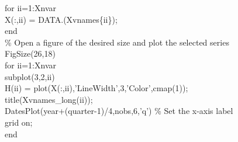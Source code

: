 \hspace{1mm}\hspace{5mm} \textcolor{matlabblue}{for} ii=1:Xnvar \\ 
\hspace{1mm}\hspace{5mm} \hspace{5mm} X(:,ii) = DATA.(Xvnames\{ii\}); \\ 
\hspace{1mm}\hspace{5mm} \textcolor{matlabblue}{end} \\ 
\hspace{1mm}\hspace{5mm} \textcolor{matlabgreen}{\% Open a figure of the desired size and plot the selected series }\\ 
\hspace{1mm}\hspace{5mm} FigSize(26,18) \\ 
\hspace{1mm}\hspace{5mm} \textcolor{matlabblue}{for} ii=1:Xnvar \\ 
\hspace{1mm}\hspace{5mm} \hspace{5mm} subplot(3,2,ii) \\ 
\hspace{1mm}\hspace{5mm} \hspace{5mm} H(ii) = plot(X(:,ii),\textcolor{matlabpurple}{'LineWidth'},3,\textcolor{matlabpurple}{'Color'},cmap(1)); \\ 
\hspace{1mm}\hspace{5mm} \hspace{5mm} title(Xvnames\_long(ii));  \\ 
\hspace{1mm}\hspace{5mm} \hspace{5mm} DatesPlot(year+(quarter-1)/4,nobs,6,\textcolor{matlabpurple}{'q'}) \textcolor{matlabgreen}{\% Set the x-axis label  }\\ 
\hspace{1mm}\hspace{5mm} \hspace{5mm} grid on;  \\ 
\hspace{1mm}\hspace{5mm} \textcolor{matlabblue}{end} \\ 
